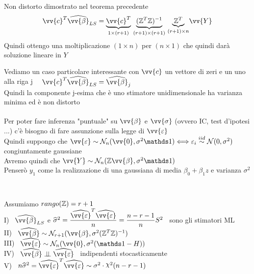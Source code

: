 \begin{Dim}
    Non distorto dimostrato nel teorema precedente
    \[
    \vv{c}^T\hat{\vv{\beta}}_{LS} = \UB{1\times(r+1)}{\vv{c}^T} \ \UB{(r+1)\times(r+1)}{ (\ZZ^T\ZZ)^{-1}} \ \UB{(r+1)\times n}{\ZZ^T} \vv{Y}
    \]
    Quindi ottengo una moltiplicazione $(1\times n)$ per $(n \times 1)$ che quindi darà soluzione lineare in $Y$ 
\end{Dim}

Vediamo un caso particolare interessante con $\vv{c}$ un vettore di zeri e un uno alla riga j  \ \ $\vv{c}^T\hat{\vv{\beta}}_{LS} = \hat{\vv{\beta}}_j$\\
Quindi la componente j-esima che è uno stimatore unidimensionale ha varianza minima ed è non distorto\\ \\


Per poter fare inferenza "puntuale" su $\vv{\beta}$ e $\vv{\sigma}$ (ovvero IC, test d'ipotesi ...) c'è bisogno di fare assunzione sulla legge di $\vv{\eps}$\\
Quindi suppongo che $\vv{\eps} \sim \Nc_n(\vv{0}, \sigma^2 \II) \Longleftrightarrow \eps_i \overset{iid}{\sim} \Nc(0,\sigma^2) $ congiuntamente gaussiane\\
Avremo quindi che $\vv{Y}\sim \Nc_n (\ZZ \vv{\beta}, \sigma^2 \II)$\\

Penserò $y_1$ come la realizzazione di una gaussiana di media $\beta_0 + \beta_1 z$ e varianza $\sigma^2$


\phantom{}


\\

\begin{teo}
    Assumiamo $rango(\mathbb Z)=r+1$\\
    I) \ $\hat{\vv{\beta}}_{LS}$ e $\hat{\sigma}^2 = \frac{\hat{\vv{\eps}}^T\hat{\vv{\eps}}}{n}= \frac{n-r-1}{n}S^2$ \ sono gli stimatori ML\\
    II) \ $\hat{\vv{\beta}} \sim \Nc_{r+1}(\vv{\beta},\sigma^2(\ZZ^T\ZZ)^{-1})$\\
    III) \ $\hat{\vv{\eps}}\sim \Nc_n(\vv{0},\sigma^2(\II-H))$\\
    IV) \ $\hat{\vv{\beta}}\ind \hat{\vv{\eps}}$ \ indipendenti stocasticamente \\
    V) \ $n\hat{\sigma}^2 = \hat{\vv{\eps}}^T\hat{\vv{\eps}} \sim \sigma^2 \cdot \Chi^2(n-r-1)$
\end{teo}

